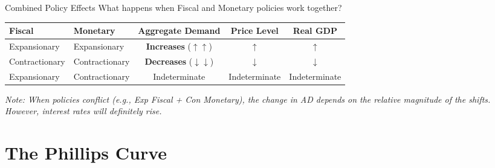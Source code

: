\documentclass[aspectratio=169]{beamer}
\begin{document}
\begin{frame}{Combined Policy Effects}
    What happens when Fiscal and Monetary policies work together?
    
    \begin{table}[]
        \centering
        \begin{tabular}{@{}llccc@{}}
            \toprule
            \textbf{Fiscal} & \textbf{Monetary} & \textbf{Aggregate Demand} & \textbf{Price Level} & \textbf{Real GDP} \\ \midrule
            Expansionary & Expansionary & \textbf{Increases} ($\uparrow\uparrow$) & $\uparrow$ & $\uparrow$ \\
            Contractionary & Contractionary & \textbf{Decreases} ($\downarrow\downarrow$) & $\downarrow$ & $\downarrow$ \\
            Expansionary & Contractionary & Indeterminate & Indeterminate & Indeterminate \\ 
            \bottomrule
        \end{tabular}
    \end{table}
    \vspace{0.5cm}
    \small{\textit{Note: When policies conflict (e.g., Exp Fiscal + Con Monetary), the change in AD depends on the relative magnitude of the shifts. However, interest rates will definitely rise.}}
\end{frame}

\section{The Phillips Curve}
\end{document}
